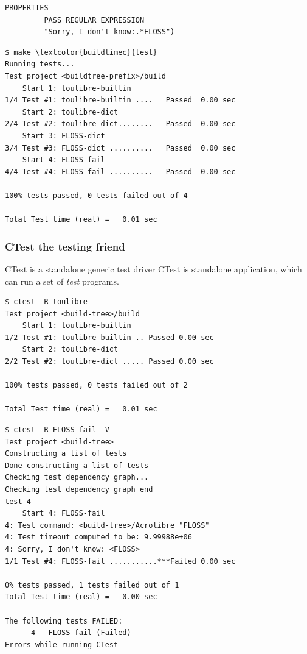 \documentclass[compress,slidestop,table
              ]
               {beamer}
\begin{document}
\begin{frame}
\begin{multicols}{2}
\begin{lstlisting}[escapechar={§},basicstyle=\tiny,caption=add CTest support]
         PROPERTIES
         PASS_REGULAR_EXPRESSION
         "Sorry, I don't know:.*FLOSS")
\end{lstlisting}
\columnbreak
\begin{Verbatim}[commandchars=\\\{\},fontsize=\tiny]
$ make \textcolor{buildtimec}{test}
Running tests...
Test project <buildtree-prefix>/build
    Start 1: toulibre-builtin
1/4 Test #1: toulibre-builtin ....   Passed  0.00 sec
    Start 2: toulibre-dict
2/4 Test #2: toulibre-dict........   Passed  0.00 sec
    Start 3: FLOSS-dict
3/4 Test #3: FLOSS-dict ..........   Passed  0.00 sec
    Start 4: FLOSS-fail
4/4 Test #4: FLOSS-fail ..........   Passed  0.00 sec

100% tests passed, 0 tests failed out of 4

Total Test time (real) =   0.01 sec
\end{Verbatim}
\end{multicols}
\end{frame}

\begin{frame}[fragile]
\frametitle{CTest the testing friend}
\begin{block}{CTest is a standalone generic test driver}
CTest is standalone application, which can run a set of \emph{test} programs.
\end{block}
\vspace*{-0.5cm}
\begin{multicols}{2}
\begin{Verbatim}[commandchars=\\\{\},fontsize=\tiny]
$ ctest -R toulibre-
Test project <build-tree>/build
    Start 1: toulibre-builtin
1/2 Test #1: toulibre-builtin .. Passed 0.00 sec
    Start 2: toulibre-dict
2/2 Test #2: toulibre-dict ..... Passed 0.00 sec

100% tests passed, 0 tests failed out of 2

Total Test time (real) =   0.01 sec
\end{Verbatim}
\columnbreak
\begin{Verbatim}[commandchars=\\\{\},fontsize=\tiny]
$ ctest -R FLOSS-fail -V
Test project <build-tree>
Constructing a list of tests
Done constructing a list of tests
Checking test dependency graph...
Checking test dependency graph end
test 4
    Start 4: FLOSS-fail
4: Test command: <build-tree>/Acrolibre "FLOSS"
4: Test timeout computed to be: 9.99988e+06
4: Sorry, I don't know: <FLOSS>
1/1 Test #4: FLOSS-fail ...........***Failed 0.00 sec

0% tests passed, 1 tests failed out of 1
Total Test time (real) =   0.00 sec

The following tests FAILED:
	  4 - FLOSS-fail (Failed)
Errors while running CTest
\end{Verbatim}
\end{multicols}
\end{frame}
\end{document}
